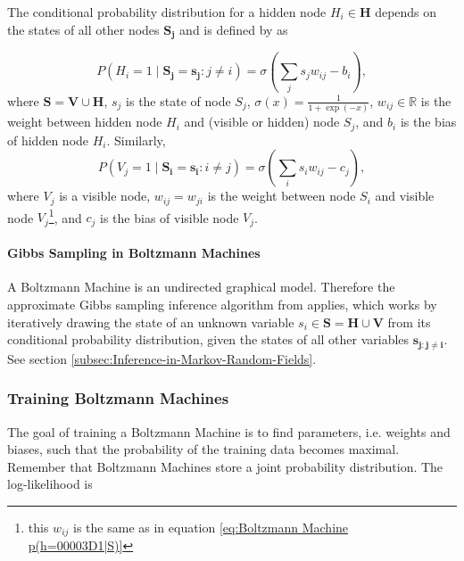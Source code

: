 The conditional probability distribution for a hidden node $H_{i}\in\mathbf{H}$
depends on the states of all other nodes $\mathbf{S_{j}}$ and is
defined by \cite{HintonSejnowski1986}  as

\begin{equation}
P(H_{i}=1\mid\mathbf{S_{j}}=\mathbf{s_{j}}:j\neq i)=\sigma\left(\sum_{j}s_{j}w_{ij}-b_{i}\right),\label{eq:Boltzmann Machine p(h=00003D1|S)}
\end{equation}
where $\mathbf{S}=\mathbf{V}\cup\mathbf{H}$, $s_{j}$ is the state
of node $S_{j}$, $\sigma(x)=\frac{1}{1+\exp(-x)}$, $w_{ij}\in\mathbb{R}$
is the weight between hidden node $H_{i}$ and (visible or hidden)
node $S_{j}$, and $b_{i}$ is the bias of hidden node $H_{i}$. Similarly,
\[
P(V_{j}=1\mid\mathbf{S_{i}}=\mathbf{s_{i}}:i\neq j)=\sigma\left(\sum_{i}s_{i}w_{ij}-c_{j}\right),
\]
where $V_{j}$ is a visible node, $w_{ij}=w_{ji}$ is the weight between
node $S_{i}$ and visible node $V_{j}$\footnote{this $w_{ij}$ is the same as in equation \ref{eq:Boltzmann Machine p(h=00003D1|S)}},
and $c_{j}$ is the bias of visible node $V_{j}$.

\paragraph{Gibbs Sampling in Boltzmann Machines}

A Boltzmann Machine is an undirected graphical model. Therefore the
approximate Gibbs sampling inference algorithm from \cite{Neal1993}
applies, which works by iteratively drawing the state of an unknown
variable $s_{i}\in\mathbf{S}=\mathbf{H}\cup\mathbf{V}$ from its conditional
probability distribution, given the states of all other variables
$\mathbf{s_{j:j\neq\mathbf{i}}}$. See section \ref{subsec:Inference-in-Markov-Random-Fields}.

\subsubsection{Training Boltzmann Machines}

The goal of training a Boltzmann Machine is to find parameters,
i.e. weights and biases, such that the probability of the training
data becomes maximal. Remember that Boltzmann Machines store a joint
probability distribution. The log-likelihood is

